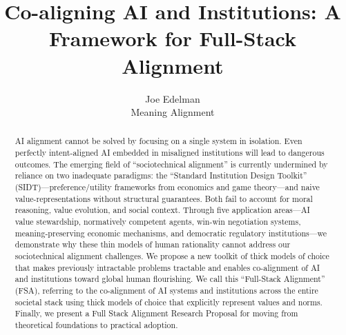 \documentclass{article}
\title{Co-aligning AI and Institutions: A Framework for Full-Stack Alignment}
\author{
  Joe Edelman\\
  Meaning Alignment\\
}
\begin{document}
\maketitle

\begin{abstract}
AI alignment cannot be solved by focusing on a single system in isolation. Even perfectly intent-aligned AI embedded in misaligned institutions will lead to dangerous outcomes. The emerging field of ``sociotechnical alignment'' is currently undermined by reliance on two inadequate paradigms: the ``Standard Institution Design Toolkit'' (SIDT)---preference/utility frameworks from economics and game theory---and naive value-representations without structural guarantees. Both fail to account for moral reasoning, value evolution, and social context. Through five application areas---AI value stewardship, normatively competent agents, win-win negotiation systems, meaning-preserving economic mechanisms, and democratic regulatory institutions---we demonstrate why these thin models of human rationality cannot address our sociotechnical alignment challenges. We propose a new toolkit of thick models of choice that makes previously intractable problems tractable and enables co-alignment of AI and institutions toward global human flourishing. We call this ``Full-Stack Alignment'' (FSA), referring to the co-alignment of AI systems and institutions across the entire societal stack using thick models of choice that explicitly represent values and norms. Finally, we present a Full Stack Alignment Research Proposal for moving from theoretical foundations to practical adoption.
\end{abstract}










\renewcommand{\bibsection}{\section*{References}}
\setlength{\bibsep}{0.0pt}


\end{document}
